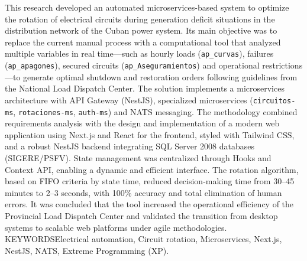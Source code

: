 {%
This research developed an automated microservices-based system to optimize the rotation of electrical circuits during generation deficit situations in the distribution network of the Cuban power system. Its main objective was to replace the current manual process with a computational tool that analyzed multiple variables in real time---such as hourly loads (\texttt{ap\_curvas}), failures (\texttt{ap\_apagones}), secured circuits (\texttt{ap\_Aseguramientos}) and operational restrictions---to generate optimal shutdown and restoration orders following guidelines from the National Load Dispatch Center. The solution implements a microservices architecture with API Gateway (NestJS), specialized microservices (\texttt{circuitos-ms}, \texttt{rotaciones-ms}, \texttt{auth-ms}) and NATS messaging. The methodology combined requirements analysis with the design and implementation of a modern web application using Next.js and React for the frontend, styled with Tailwind CSS, and a robust NestJS backend integrating SQL Server 2008 databases (SIGERE/PSFV). State management was centralized through Hooks and Context API, enabling a dynamic and efficient interface. The rotation algorithm, based on FIFO criteria by state time, reduced decision-making time from 30--45 minutes to 2--3 seconds, with 100\% accuracy and total elimination of human errors. It was concluded that the tool increased the operational efficiency of the Provincial Load Dispatch Center and validated the transition from desktop systems to scalable web platforms under agile methodologies. \noindent KEYWORDS\newline Electrical automation, Circuit rotation, Microservices, Next.js, NestJS, NATS, Extreme Programming (XP).
}